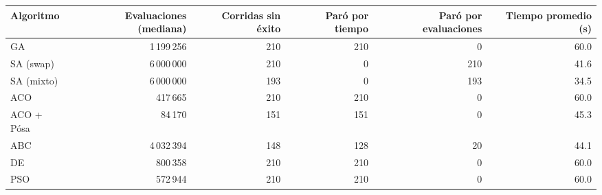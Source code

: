 \begin{tabular}{lrrrrr}
\toprule
Algoritmo & Evaluaciones (mediana) & Corridas sin éxito & Paró por tiempo & Paró por evaluaciones & Tiempo promedio (s) \\
\midrule
GA & 1\,199\,256 & 210 & 210 & 0 & 60.0 \\
SA (swap) & 6\,000\,000 & 210 & 0 & 210 & 41.6 \\
SA (mixto) & 6\,000\,000 & 193 & 0 & 193 & 34.5 \\
ACO & 417\,665 & 210 & 210 & 0 & 60.0 \\
ACO + Pósa & 84\,170 & 151 & 151 & 0 & 45.3 \\
ABC & 4\,032\,394 & 148 & 128 & 20 & 44.1 \\
DE & 800\,358 & 210 & 210 & 0 & 60.0 \\
PSO & 572\,944 & 210 & 210 & 0 & 60.0 \\
\bottomrule
\end{tabular}
